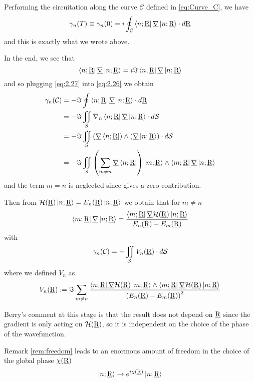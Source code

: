 Performing the circuitation along the curve $ \mathcal{C} $ defined in \eqref{eq:Curve_C}, we have
\begin{equation}
\gamma_n(T)\equiv \gamma_n(0)=i\oint_{\mathcal{C}}\Bra{n;\underline{\textrm{R}}}\underline{\nabla}\Ket{n;\underline{\textrm{R}}}\cdot\mathop{}\!d\underline{\textrm{R}}
\label{eq:2.26}\end{equation} 
and this is exactly what we wrote above.

In the end, we see that 
\begin{equation}
\Bra{n;\underline{\textrm{R}}}\underline{\nabla}\Ket{n;\underline{\textrm{R}}}=i\Im\Bra{n;\underline{\textrm{R}}}\underline{\nabla}\Ket{n;\underline{\textrm{R}}}
\label{eq:2.27}
\end{equation}
and so plugging \eqref{eq:2.27} into \eqref{eq:2.26} we obtain
\begin{align}
\gamma_n(\mathcal{C})&=-\Im \oint \Bra{n;\underline{\textrm{R}}}\underline{\nabla}\Ket{n;\underline{\textrm{R}}}\cdot\mathop{}\!d\underline{\textrm{R}}\\
&=-\Im\iint_{\mathcal{S}}\nabla_n\Bra{n;\underline{\textrm{R}}}\underline{\nabla}\Ket{n;\underline{\textrm{R}}}\cdot\mathop{}\!d\mathcal{S}\\
&=-\Im\iint_{\mathcal{S}}\left(\underline{\nabla}\Bra{n;\underline{\textrm{R}}}\right)\wedge\left(\underline{\nabla}\Ket{n;\underline{\textrm{R}}}\right)\cdot\mathop{}\!d\mathcal{S}\\
&= -\Im \iint_{\mathcal{S}}\left(\sum_{m\neq n}\underline{\nabla}\Bra{n;\underline{\textrm{R}}}\right)\Ket{m;\underline{\textrm{R}}}\wedge\Bra{m;\underline{\textrm{R}}}\underline{\nabla}\Ket{n;\underline{\textrm{R}}}
\end{align}
and the term $ m=n $ is neglected since gives a zero contribution.

Then from $ \mathcal{H}(\underline{\textrm{R}})\Ket{n;\underline{\textrm{R}}}=E_n(\underline{\textrm{R}})\Ket{n;\underline{\textrm{R}}} $ we obtain that for $ m\neq n $
\begin{equation}
\Bra{m;\underline{\textrm{R}}}\underline{\nabla}\Ket{n;\underline{\textrm{R}}}=\dfrac{\Bra{m;\underline{\textrm{R}}}\underline{\nabla}\mathcal{H}(\underline{\textrm{R}})\Ket{n;\underline{\textrm{R}}}}{E_n(\underline{\textrm{R}})-E_m(\underline{\textrm{R}})}
\end{equation}
with \begin{equation}
\gamma_n(\mathcal{C})=-\iint_{\mathcal{S}}V_n(\underline{\textrm{R}})\cdot\mathop{}\!d\mathcal{S}
\end{equation}
where we defined $ V_n $ as 
\begin{equation}
V_n(\underline{\textrm{R}}):=\Im\sum_{m\neq n}\dfrac{\Bra{n;\underline{\textrm{R}}}\underline{\nabla}\mathcal{H}(\underline{\textrm{R}})\Ket{m;\underline{\textrm{R}}}\wedge\Bra{m;\underline{\textrm{R}}}\underline{\nabla}\mathcal{H}(\underline{\textrm{R}})\Ket{n;\underline{\textrm{R}}}}{\left(E_n(\underline{\textrm{R}})-E_m(\underline{\textrm{R}})\right)^2}
\label{eq:2.31}
\end{equation}
\begin{rem}
	Berry's comment at this stage is that the result does not depend on $ \underline{\textrm{R}} $ since the gradient is only acting on $ \mathcal{H}(\underline{\textrm{R}}) $, so it is independent on the choice of the phase of the wavefunction.
	\label{rem:freedom}
\end{rem}
Remark \ref{rem:freedom} leads to an enormous amount of freedom in the choice of the global phase $ \chi(\underline{\textrm{R}}) $
\begin{equation}
\Ket{n;\underline{\textrm{R}}}\to e^{i\chi(\underline{\textrm{R}})}\Ket{n;\underline{\textrm{R}}}
\end{equation}
